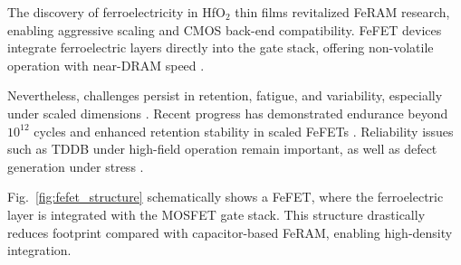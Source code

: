 The discovery of ferroelectricity in HfO$_2$ thin films \cite{boscke2011} revitalized FeRAM research, enabling aggressive scaling and CMOS back-end compatibility. FeFET devices integrate ferroelectric layers directly into the gate stack, offering non-volatile operation with near-DRAM speed \cite{mueller2012,li2022}. 

Nevertheless, challenges persist in retention, fatigue, and variability, especially under scaled dimensions \cite{schenk2015,kim2020}. Recent progress has demonstrated endurance beyond $10^{12}$ cycles and enhanced retention stability in scaled FeFETs \cite{li2022}. Reliability issues such as TDDB under high-field operation remain important, as well as defect generation under stress \cite{park2020}.

Fig.~\ref{fig:fefet_structure} schematically shows a FeFET, where the ferroelectric layer is integrated with the MOSFET gate stack. This structure drastically reduces footprint compared with capacitor-based FeRAM, enabling high-density integration.
